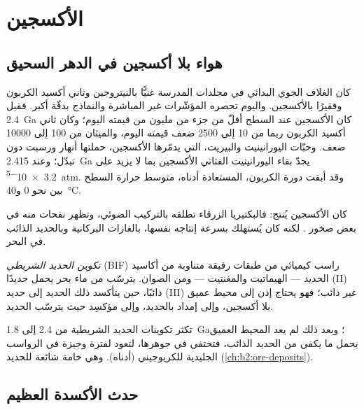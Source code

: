 \section{الأكسجين}\label{sec:b2:precambrian-earth:oxygen}

\subsection*{هواء بلا أكسجين في الدهر السحيق}

كان الغلاف الجوي البدائي في مجلدات المدرسة غنيًّا بالنيتروجين وثاني أكسيد الكربون
وفقيرًا بالأكسجين. واليوم تحصره المؤشّرات غير المباشرة والنماذج بدقّة أكبر. فقبل \qty{2.4}{Ga} كان الأكسجين
عند السطح أقلّ من جزء من مليون من قيمته اليوم؛ وكان ثاني أكسيد الكربون ربما من 10 إلى 2500
ضعف قيمته اليوم، والميثان من 100 إلى \num{10000} ضعف. وحبّات اليورانينيت والبيريت، التي
يدمّرها الأكسجين، حملتها أنهار  ورسبت دون تبدّل؛ وعند \qty{2.415}{Ga}
يحدّ بقاء اليورانينيت الفتاتي الأكسجين بما لا يزيد على \qty{3.2e-5}{atm}. وقد أبقت دورة الكربون، المستعادة
أدناه، متوسط حرارة السطح بين نحو 0 و\qty{40}{\celsius}.

كان الأكسجين يُنتج: فالبكتيريا الزرقاء تطلقه بالتركيب الضوئي، وتظهر نفحات منه في
بعض صخور . لكنه كان يُستهلك بسرعة إنتاجه نفسها، بالغازات البركانية وبالحديد
الذائب في البحر.

\begin{definition}\label{def:b2:precambrian-earth:bif}
\emph{تكوين الحديد الشريطي} (BIF) راسب كيميائي من
طبقات رقيقة متناوبة من أكاسيد الحديد --- الهيماتيت والمغنتيت --- ومن الصوان. يترسّب
من ماء بحر يحمل حديدًا (II) ذائبًا، حين يتأكسد ذلك الحديد إلى حديد (III) غير
ذائب؛ فهو يحتاج إذن إلى محيط عميق بلا أكسجين، وإلى إمداد بالحديد، وإلى مؤكسِد
حيث يترسّب الحديد.
\end{definition}

تكثر تكوينات الحديد الشريطية من 2.4 إلى \qty{1.8}{Ga}؛ وبعد ذلك لم يعد المحيط العميق
يحمل ما يكفي من الحديد الذائب، فتختفي في جوهرها، لتعود لفترة وجيزة في
الرواسب الجليدية للكريوجيني (أدناه). وهي خامة شائعة للحديد
(\cref{ch:b2:ore-deposits}).

\subsection*{حدث الأكسدة العظيم}

